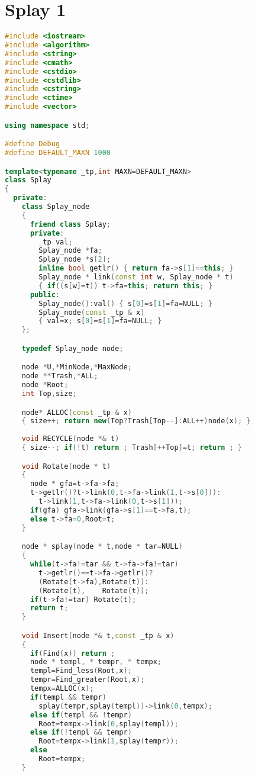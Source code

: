 \documentclass[UTF8]{report}
\numberwithin{figure}{subsection}
\numberwithin{table}{subsection}
\begin{document}
\section{Splay 1}
\begin{lstlisting}[language=c++]
#include <iostream>
#include <algorithm>
#include <string>
#include <cmath>
#include <cstdio>
#include <cstdlib>
#include <cstring>
#include <ctime>
#include <vector>

using namespace std;

#define Debug
#define DEFAULT_MAXN 1000

template<typename _tp,int MAXN=DEFAULT_MAXN>
class Splay
{
  private:
    class Splay_node
    {
      friend class Splay;
      private:
        _tp val;
        Splay_node *fa;
        Splay_node *s[2];
        inline bool getlr() { return fa->s[1]==this; }
        Splay_node * link(const int w, Splay_node * t)
        { if((s[w]=t)) t->fa=this; return this; }
      public:
        Splay_node():val() { s[0]=s[1]=fa=NULL; }
        Splay_node(const _tp & x)
        { val=x; s[0]=s[1]=fa=NULL; }
    };

    typedef Splay_node node;

    node *U,*MinNode,*MaxNode;
    node **Trash,*ALL;
    node *Root;
    int Top,size;

    node* ALLOC(const _tp & x)
    { size++; return new(Top?Trash[Top--]:ALL++)node(x); }
    
    void RECYCLE(node *& t)
    { size--; if(!t) return ; Trash[++Top]=t; return ; }

    void Rotate(node * t)
    {
      node * gfa=t->fa->fa;
      t->getlr()?t->link(0,t->fa->link(1,t->s[0])):
        t->link(1,t->fa->link(0,t->s[1]));
      if(gfa) gfa->link(gfa->s[1]==t->fa,t);
      else t->fa=0,Root=t;
    }

    node * splay(node * t,node * tar=NULL)
    {
      while(t->fa!=tar && t->fa->fa!=tar)
        t->getlr()==t->fa->getlr()?
        (Rotate(t->fa),Rotate(t)):
        (Rotate(t),    Rotate(t));
      if(t->fa!=tar) Rotate(t);
      return t;
    }

    void Insert(node *& t,const _tp & x)
    {
      if(Find(x)) return ;
      node * templ, * tempr, * tempx;
      templ=Find_less(Root,x);
      tempr=Find_greater(Root,x);
      tempx=ALLOC(x);
      if(templ && tempr)
        splay(tempr,splay(templ))->link(0,tempx);
      else if(templ && !tempr)
        Root=tempx->link(0,splay(templ));
      else if(!templ && tempr)
        Root=tempx->link(1,splay(tempr));
      else
        Root=tempx;
    }


\end{lstlisting}
\end{document}
